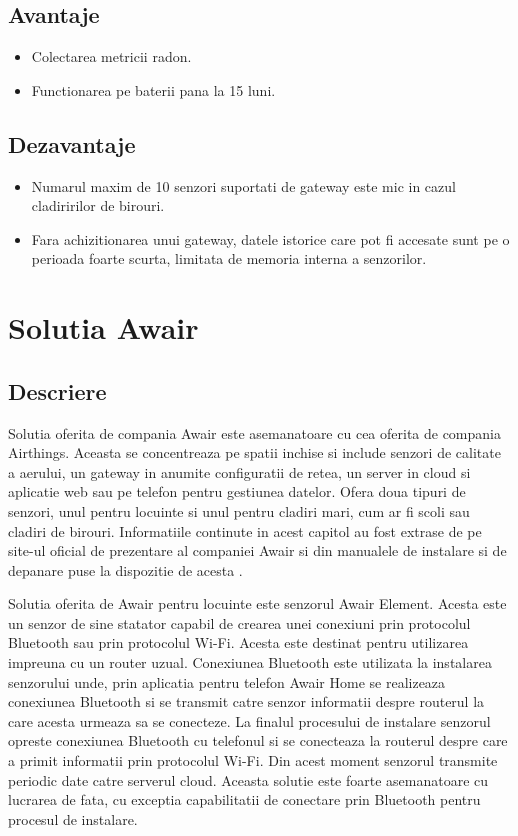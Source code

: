 \subsection{Avantaje}\label{subsec:airthings_avantaje}
\begin{itemize}
	\item Colectarea metricii radon.
	\item Functionarea pe baterii pana la 15 luni.
\end{itemize}

\subsection{Dezavantaje}\label{subsec:airthings_dezavantaje}
\begin{itemize}
	\item Numarul maxim de 10 senzori suportati de gateway este mic in cazul cladiririlor de birouri.
	\item Fara achizitionarea unui gateway, datele istorice care pot fi accesate sunt pe o perioada foarte scurta, limitata de memoria interna a senzorilor.
\end{itemize}

\section{Solutia Awair}\label{sec:awair}
\subsection{Descriere}\label{subsec:awair_descriere}
Solutia oferita de compania Awair este asemanatoare cu cea oferita de compania Airthings. Aceasta se concentreaza pe spatii inchise si include senzori de calitate 
a aerului, un gateway in anumite configuratii de retea, un server in cloud si aplicatie web sau pe telefon pentru gestiunea datelor. Ofera doua tipuri de senzori, 
unul pentru locuinte si unul pentru cladiri mari, cum ar fi scoli sau cladiri de birouri. Informatiile continute in acest capitol au fost extrase de pe site-ul oficial de 
prezentare al companiei Awair si din manualele de instalare si de depanare puse la dispozitie de acesta \cite{awair}.

Solutia oferita de Awair pentru locuinte este senzorul Awair Element. Acesta este un senzor de sine statator capabil de crearea unei conexiuni prin protocolul 
Bluetooth sau prin protocolul Wi-Fi. Acesta este destinat pentru utilizarea impreuna cu un router uzual. Conexiunea Bluetooth este utilizata la instalarea senzorului 
unde, prin aplicatia pentru telefon Awair Home se realizeaza conexiunea Bluetooth si se transmit catre senzor informatii despre routerul la care acesta urmeaza sa 
se conecteze. La finalul procesului de instalare senzorul opreste conexiunea Bluetooth cu telefonul si se conecteaza la routerul despre care a primit informatii 
prin protocolul Wi-Fi. Din acest moment senzorul transmite periodic date catre serverul cloud. Aceasta solutie este foarte asemanatoare cu lucrarea de fata, cu 
exceptia capabilitatii de conectare prin Bluetooth pentru procesul de instalare.

